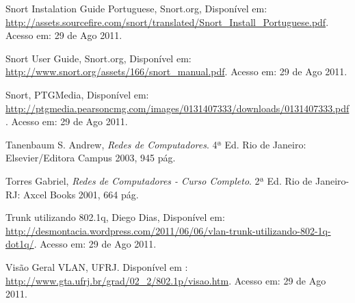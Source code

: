 \documentclass[brazil, ruledheader, pnumromarab,normaltoc]{abnt}
\begin{document}
\begin{thebibliography}{100}
 Snort Instalation Guide Portuguese, Snort.org, Disponível em: \url{http://assets.sourcefire.com/snort/translated/Snort_Install_Portuguese.pdf}. Acesso em: 29 de Ago 2011.

 Snort User Guide, Snort.org, Disponível em: \url{http://www.snort.org/assets/166/snort_manual.pdf}. Acesso em: 29 de Ago 2011.

 Snort, PTGMedia, Disponível em: \url{http://ptgmedia.pearsoncmg.com/images/0131407333/downloads/0131407333.pdf}. Acesso em: 29 de Ago 2011.

 Tanenbaum S. Andrew, \emph{Redes de Computadores}. 4ª Ed. Rio de Janeiro: Elsevier/Editora Campus 2003, 945 pág.

 Torres Gabriel, \emph{Redes de Computadores - Curso Completo}. 2ª Ed. Rio de Janeiro-RJ: Axcel Books 2001, 664 pág.

 Trunk utilizando 802.1q, Diego Dias, Disponível em: \url{http://desmontacia.wordpress.com/2011/06/06/vlan-trunk-utilizando-802-1q-dot1q/}. Acesso em: 29 de Ago 2011.

 Visão Geral VLAN, UFRJ. Disponível em : \url{http://www.gta.ufrj.br/grad/02_2/802.1p/visao.htm}. Acesso em: 29 de Ago 2011.

\end{thebibliography}
\end{document}
